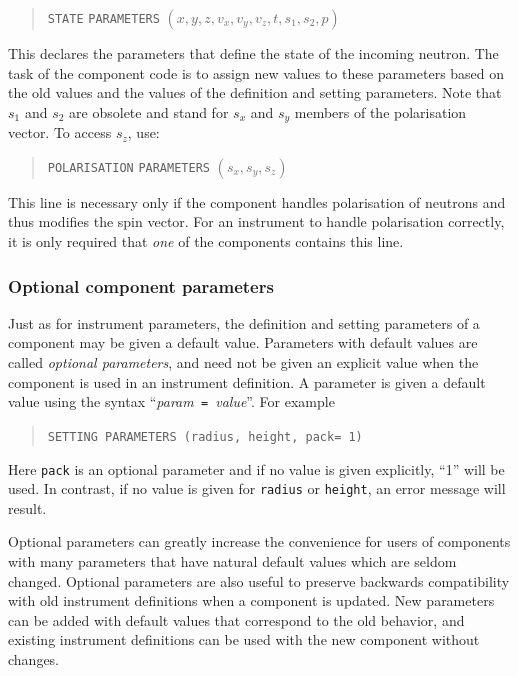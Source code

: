 \begin{quote}
  \texttt{STATE} \texttt{PARAMETERS} $(x,y,z,v_x,v_y,v_z,t,s_1,s_2,p)$
\end{quote}
This declares the parameters that define the state of the incoming
neutron. The task of the component code is to assign new values to these
parameters based on the old values and the values of the definition and
setting parameters. Note that $s_1$ and $s_2$ are obsolete and stand for
$s_x$ and $s_y$ members of the polarisation vector. To access $s_z$, use:
\begin{quote}
  \texttt{POLARISATION} \texttt{PARAMETERS} $(s_x,s_y,s_z)$
\end{quote}
This line is necessary only if the component handles polarisation of neutrons
and thus modifies the spin vector. For an instrument to handle polarisation
correctly, it is only required that {\em one} of the components contains this
line.

\subsubsection{Optional component parameters}

Just as for instrument parameters, the definition and setting parameters of a
component may be given a default value. Parameters with default values are
called \emph{optional parameters}, and need not be given an explicit value when
the component is used in an instrument definition. A parameter is given a
default value using the syntax ``\textit{param}\texttt{ = }\textit{value}''.
For example
\begin{quote}
  \texttt{SETTING PARAMETERS (radius, height, pack= 1)}
\end{quote}
Here \verb+pack+ is an optional parameter and if no value is given
explicitly, ``1'' will be used. In contrast, if no value is
  given for \texttt{radius} or \texttt{height}, an error message will
  result.

Optional parameters can greatly increase the convenience for users of
components with many parameters that have natural default values which
are seldom changed. Optional parameters are also useful to preserve
backwards compatibility with old instrument definitions when a component
is updated. New parameters can be added with default values that
correspond to the old behavior, and existing instrument definitions can
be used with the new component without changes.


